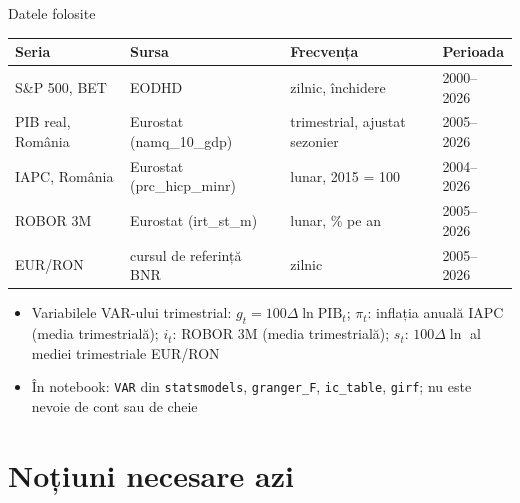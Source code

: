 \begin{frame}{Datele folosite}
\itemsize{\small}
\begin{center}
\footnotesize
\begin{tabular}{llll}
\toprule
\textbf{Seria} & \textbf{Sursa} & \textbf{Frecvența} & \textbf{Perioada} \\
\midrule
S\&P 500, BET & EODHD & zilnic, închidere & 2000--2026 \\
PIB real, România & Eurostat (namq\_10\_gdp) & trimestrial, ajustat sezonier & 2005--2026 \\
IAPC, România & Eurostat (prc\_hicp\_minr) & lunar, 2015 = 100 & 2004--2026 \\
ROBOR 3M & Eurostat (irt\_st\_m) & lunar, \% pe an & 2005--2026 \\
EUR/RON & cursul de referință BNR & zilnic & 2005--2026 \\
\bottomrule
\end{tabular}
\end{center}
\begin{itemize}
    \item Variabilele VAR-ului trimestrial: $g_t = 100\Delta\ln\mathrm{PIB}_t$; $\pi_t$: inflația anuală IAPC (media trimestrială); $i_t$: ROBOR 3M (media trimestrială); $s_t$: $100\Delta\ln$ al mediei trimestriale EUR/RON
    \item În notebook: \texttt{VAR} din \texttt{statsmodels}, \texttt{granger\_F}, \texttt{ic\_table}, \texttt{girf}; nu este nevoie de cont sau de cheie
\end{itemize}
\end{frame}


\section{Noțiuni necesare azi}

